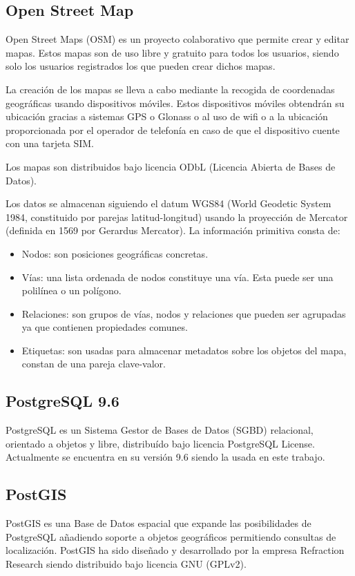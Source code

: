 \subsection{Open Street Map}
Open Street Maps (OSM) \cite{osm:wiki} es un proyecto colaborativo que permite crear y editar mapas. Estos mapas son de uso libre y gratuito para todos los usuarios, siendo solo los usuarios registrados los que pueden crear dichos mapas.

La creación de los mapas se lleva a cabo mediante la recogida de coordenadas geográficas usando dispositivos móviles. Estos dispositivos móviles obtendrán su ubicación gracias a sistemas GPS o Glonass o al uso de wifi o a la ubicación proporcionada por el operador de telefonía en caso de que el dispositivo cuente con una tarjeta SIM.

Los mapas son distribuidos bajo licencia ODbL (Licencia Abierta de Bases de Datos).

Los datos se almacenan siguiendo el datum WGS84 (World Geodetic System 1984, constituido por parejas latitud-longitud) usando la proyección de Mercator (definida en 1569  por Gerardus Mercator). La información primitiva consta de:

\begin{itemize}
	\item Nodos: son posiciones geográficas concretas.
	\item Vías: una lista ordenada de nodos constituye una vía. Esta puede ser una polilínea o un polígono.
	\item Relaciones: son grupos de vías, nodos y relaciones que pueden ser agrupadas ya que contienen propiedades comunes.
	\item Etiquetas: son usadas para almacenar metadatos sobre los objetos del mapa, constan de una pareja clave-valor. 
\end{itemize}

\subsection{PostgreSQL 9.6}
PostgreSQL \cite{post:info} es un Sistema Gestor de Bases de Datos (SGBD) relacional, orientado a objetos y libre, distribuído bajo licencia PostgreSQL License. Actualmente se encuentra en su versión 9.6 siendo la usada en este trabajo.

\subsection{PostGIS}
PostGIS \cite{postgis:wiki} es una Base de Datos espacial que expande las posibilidades de PostgreSQL añadiendo soporte a objetos geográficos permitiendo consultas de localización. PostGIS ha sido diseñado y desarrollado por la empresa Refraction Research siendo distribuido bajo licencia GNU (GPLv2).

